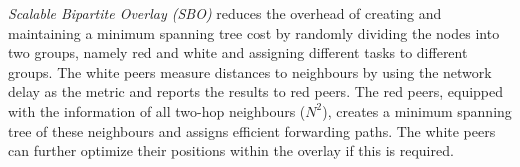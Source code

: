 \documentclass[acmcsur,acmnow]{acmtrans2m}
\begin{document}
\emph{Scalable Bipartite Overlay (SBO)} \cite{liu_bipartite_IPDPS,liu_bipartite_2007} reduces the overhead of creating and maintaining a minimum spanning tree cost by randomly dividing the nodes into two groups, namely red and white and assigning different tasks to different groups. The white peers measure distances to neighbours by using the network delay as the metric and reports the results to red peers. The red peers, equipped with the
information of all two-hop neighbours ($N^2$), creates a minimum spanning tree
of these neighbours and assigns efficient forwarding paths. The white peers can
further optimize their positions within the overlay if this is required.

%
%
%
\end{document}
